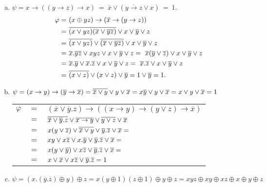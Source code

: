 \begin{solution}
  \begin{enumerate}[a)]
  \item
    $\psi =  x\rightarrow ((y\rightarrow z)\rightarrow x)\ =\ \overline{x}\vee (\overline{y\rightarrow z}\vee x)\  =\ 1$.
    \begin{align*}
      \varphi =\ & (x\oplus yz)\rightarrow (\overline{x}\rightarrow (y\rightarrow z))\\
      =\ & \overline{(x\vee yz)(\overline{x}\vee\overline{yz})} \vee x\vee \overline{y}\vee z\\
      =\ & \overline{(x\vee yz)}\vee\overline{(\overline{x}\vee\overline{yz})} \vee x\vee \overline{y}\vee z\\
      =\ & \overline{x}.\overline{yz} \vee xyz \vee x\vee \overline{y}\vee z =\ \overline{x}(\overline{y}\vee\overline{z}) \vee x\vee \overline{y}\vee z\\
      =\ & \overline{x}.\overline{y} \vee \overline{x}.\overline{z} \vee x\vee \overline{y}\vee z =\ \overline{x}.\overline{z} \vee x\vee \overline{y}\vee z\\
      =\ & \overline{(x\vee z)} \vee (x\vee z)\vee \overline{y} = 1 \vee \overline{y} = 1.
    \end{align*}
  \item
    $\psi = (x\rightarrow y)\rightarrow(\overline{y}\rightarrow\overline{x}) = 
    \overline{\overline{x}\vee y} \vee y \vee \overline{x} = x\overline{y} \vee y \vee \overline{x} = x \vee y \vee \overline{x} = 1$
    
    \begin{tabular}{l c l}
      $\varphi $ & $=$ & $(\overline{x}\vee \overline{y}.z)\rightarrow ((x\rightarrow y)\rightarrow (y\vee z)\rightarrow\overline{x}) $\\
      & $ = $ & $\overline{\overline{x}\vee \overline{y}.z} \vee \overline{x\rightarrow y} \vee \overline{y\vee z} \vee \overline{x}$ \\
      & $=$ & $x(y\vee \overline{z})\vee \overline{\overline{x}\vee y} \vee \overline{y}.\overline{z} \vee \overline{x} = $\\
      & $=$ & $xy \vee x\overline{z} \vee x.\overline{y} \vee \overline{y}.\overline{z} \vee \overline{x} =$ \\
      & $=$ & $x(y\vee\overline{y}) \vee x\overline{z} \vee \overline{y}.\overline{z} \vee \overline{x} = $\\
      & $=$ & $x \vee \overline{x} \vee x\overline{z} \vee \overline{y}.\overline{z} = 1$
    \end{tabular}
    
  \item
    $\psi = (x.(\overline{y}.\overline{z})\oplus y)\oplus z = x(y\oplus 1)(z\oplus 1) \oplus y \oplus z = xyz \oplus xy \oplus xz \oplus x \oplus y \oplus z$
    

\end{enumerate}
\end{solution}
